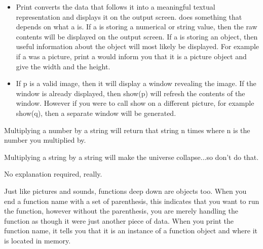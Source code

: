 \begin{exercises}
\begin{ex}
\begin{itemize}
\item Print converts the data that follows it into a meaningful textual
representation and displays it on the output screen.  does
something that depends on what a is. If a is storing a numerical or string
value, then the raw contents will be displayed on the output screen. If a
is storing an object, then useful information about the object will most
likely be displayed. For example if a was a picture, print a would inform
you that it is a picture object and give the width and the height.

\item If p is a valid image, then it will display a window revealing the
image.  If the window is already displayed, then show(p) will refresh the
contents of the window. However if you were to call show on a different
picture, for example show(q), then a separate window will be generated.
\end{itemize}
\end{ex}

\begin{ex}
Multiplying a number by a string will return that string n times where n is
the number you multiplied by.

Multiplying a string by a string will make the universe collapse...so don't
do that.
\end{ex}


\begin{ex}
No explanation required, really.
\end{ex}


\begin{ex}
Just like pictures and sounds, functions deep down are objects too.  When
you end a function name with a set of parenthesis, this indicates that you
want to run the function, however without the parenthesis, you are merely
handling the function as though it were just another piece of data. When
you print the function name, it tells you that it is an instance of a
function object and where it is located in memory.
\end{ex}

\end{exercises}
